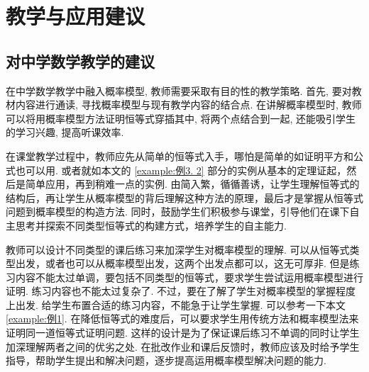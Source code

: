 
\chapter{教学与应用建议}
\section{对中学数学教学的建议}
在中学数学教学中融入概率模型, 教师需要采取有目的性的教学策略. 首先, 要对教材内容进行通读, 寻找概率模型与现有教学内容的结合点. 在讲解概率模型时, 教师可以将用概率模型方法证明恒等式穿插其中, 将两个点结合到一起, 还能吸引学生的学习兴趣, 提高听课效率. 


在课堂教学过程中，教师应先从简单的恒等式入手，哪怕是简单的如证明平方和公式也可以用. 或者就如本文的 \ref{example:例3. 2} 部分的实例从基本的定理证起，然后是简单应用，再到稍难一点的实例. 由简入繁，循循善诱，让学生理解恒等式的结构后，再让学生从概率模型的背后理解这种方法的原理，最后才是掌握从恒等式问题到概率模型的构造方法. 同时，鼓励学生们积极参与课堂，引导他们在课下自主思考并探索不同类型恒等式的构建方式，培养学生的自主能力. 

教师可以设计不同类型的课后练习来加深学生对概率模型的理解. 可以从恒等式类型出发，或者也可以从概率模型出发，这两个出发点都可以，这无可厚非. 但是练习内容不能太过单调，要包括不同类型的恒等式，要求学生尝试运用概率模型进行证明. 练习内容也不能太过复杂了. 不过，要在了解了学生对概率模型的掌握程度上出发. 给学生布置合适的练习内容，不能急于让学生掌握. 可以参考一下本文\ref{example:例1}. 在降低恒等式的难度后，可以要求学生用传统方法和概率模型法来证明同一道恒等式证明问题. 这样的设计是为了保证课后练习不单调的同时让学生加深理解两者之间的优劣之处. 在批改作业和课后反馈时，教师应该及时给予学生指导，帮助学生提出和解决问题，逐步提高运用概率模型解决问题的能力. 


